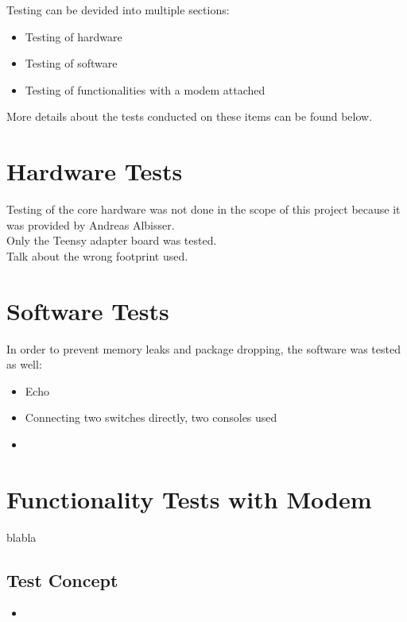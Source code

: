%
Testing can be devided into multiple sections:
\begin{itemize}
    \item Testing of hardware
    \item Testing of software 
    \item Testing of functionalities with a modem attached
\end{itemize}
More details about the tests conducted on these items can be found below.
%
%
%
%
\section{Hardware Tests}
Testing of the core hardware was not done in the scope of this project because it was provided by Andreas Albisser.\\
Only the Teensy adapter board was tested. \\
Talk about the wrong footprint used.\\
%
%
%
%
%
\section{Software Tests}
In order to prevent memory leaks and package dropping, the software was tested as well:\\
\begin{itemize}
    \item Echo
    \item Connecting two switches directly, two consoles used
    \item 
\end{itemize}
%
%
%
%
%
\section{Functionality Tests with Modem}
blabla
\subsection{Test Concept}
\begin{itemize}
    \item 
\end{itemize}



